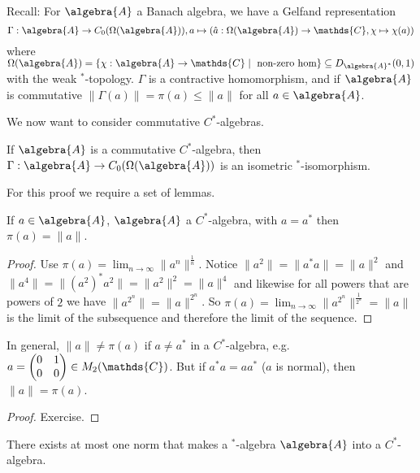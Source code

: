 \documentclass[a4paper]{article}
\begin{document}
Recall: For $\algebra{A}$ a Banach algebra, we have a Gelfand representation
\begin{equation*}
	\Gamma: \algebra{A} \to C_0(\Omega(\algebra{A})), a \mapsto (\hat{a}: \Omega(\algebra{A}) \to \mathds{C}, \chi \mapsto \chi(a))
\end{equation*}
where $\Omega(\algebra{A}) = \{\chi: \algebra{A} \to \mathds{C} \mid \text{ non-zero hom} \} \subseteq D_{\algebra{A}^*}(0,1)$ with the weak $^*$-topology.
$\Gamma$ is a contractive homomorphism, and if $\algebra{A}$ is commutative $\|\Gamma(a)\| = \pi(a) \leq \|a\|$ for all $a \in \algebra{A}$.

We now want to consider commutative $C^*$-algebras.

\begin{theorem}[Gelfand]
	If $\algebra{A}$ is a commutative $C^*$-algebra, then $\Gamma: \algebra{A} \to C_0(\Omega(\algebra{A}))$ is an isometric $^*$-isomorphism.
\end{theorem}

For this proof we require a set of lemmas.

\begin{lemma}
	If $a \in \algebra{A}$, $\algebra{A}$ a $C^*$-algebra, with $a = a^*$ then $\pi(a) = \|a\|$.
\end{lemma}

\begin{proof}
	Use $\pi(a) = \lim_{n \to \infty} \|a^n\|^{\frac{1}{n}}$.
	Notice $\|a^2\| = \|a^* a \| = \|a\|^2$ and $\|a^4\| = \|(a^2)^* a^2\| = \|a^2\|^2 = \|a\|^4$ and likewise for all powers that are powers of $2$ we have $\|a^{2^n}\| = \|a\|^{2^n}$.
	So $\pi(a) = \lim_{n \to \infty} \|a^{2^n}\|^{\frac{1}{2^n}} = \|a\|$ is the limit of the subsequence and therefore the limit of the sequence.
\end{proof}

\begin{remark}
	In general, $\|a\| \neq \pi(a)$ if $a \neq a^*$ in a $C^*$-algebra, e.g.
	$a = \qmatrix{0 & 1 \\ 0 & 0} \in M_2(\mathds{C})$.
	But if $a^* a = a a^*$ ($a$ is normal), then $\|a\| = \pi(a)$.
\end{remark}

\begin{proof}
	Exercise.
\end{proof}

\begin{corollary}
	There exists at most one norm that makes a $^*$-algebra $\algebra{A}$ into a $C^*$-algebra.
\end{corollary}
\end{document}
